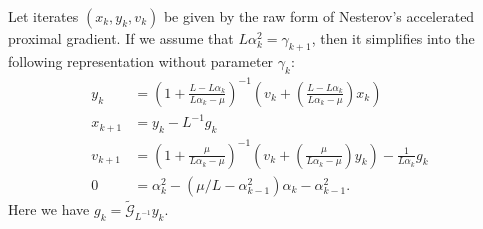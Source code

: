 \documentclass[12pt]{article}
\begin{document}
    \begin{theorem}\label{app:theorem:acc-prox-grad-intermediate}\; \\
        Let iterates $(x_k, y_k, v_k)$ be given by the raw form of Nesterov's accelerated proximal gradient. 
        If we assume that $L\alpha_k^2 = \gamma_{k + 1}$, then it simplifies into the following representation without parameter $\gamma_k$: 
        \begin{align*}
            y_k &= 
            \left(
                1 + \frac{L - L\alpha_k}{L\alpha_k - \mu}
            \right)^{-1}
            \left(
                v_k + 
                \left(\frac{L - L\alpha_k}{L\alpha_k - \mu} \right) x_k
            \right)
            \\
            x_{k + 1} &= 
            y_k - L^{-1}  g_k
            \\
            v_{k + 1} &= 
            \left(
                1 + \frac{\mu}{L \alpha_k - \mu}
            \right)^{-1}
            \left(
                v_k + 
                \left(\frac{\mu}{L \alpha_k - \mu}\right) y_k
            \right) - \frac{1}{L\alpha_{k}} g_k
            \\
            0 &= \alpha_k^2 - \left(\mu/L - \alpha_{k -1}^2\right) \alpha_k - \alpha_{k - 1}^2. 
        \end{align*}
        Here we have $g_k = \widetilde{\mathcal G}_{L^{-1}}y_k$. 
    \end{theorem}
\end{document}
